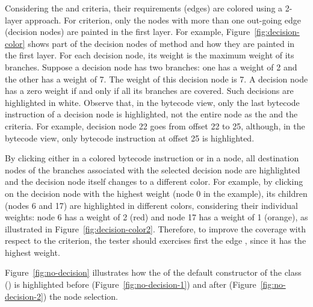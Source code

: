 Considering the  and 
criteria, their requirements (\DUG edges) are colored using a
2-layer approach. For  criterion, only the nodes
with more than one out-going edge (decision nodes) are painted in
the first layer. For example, Figure~\ref{fig:decision-color}
shows part of the decision nodes of method
 and how they are painted in the first
layer. For each decision node, its weight is the maximum weight of
its branches. Suppose a decision node has two branches: one has a
weight of 2 and the other has a weight of 7. The weight of this
decision node is 7. 
A decision node has a zero weight if and only if all its
branches are covered. Such decisions are highlighted in white.
Observe that, in the bytecode view, only the last bytecode
instruction of a decision node is highlighted, not the entire node
as the  and the  criteria. For
example, \DUG decision node 22 goes from offset 22 to 25,
although, in the bytecode view, only bytecode instruction at
offset 25 is highlighted.



By clicking either in a colored bytecode instruction or in a \DUG
node, all destination nodes of the branches associated with the
selected decision node are highlighted and the decision node
itself changes to a different color. For example, by clicking on
the decision node with the highest weight (node 0 in the
example), its children (nodes 6 and 17) are highlighted in
different colors, considering their individual weights: node 6
has a weight of 2 (red) and node 17 has a weight of 1 (orange),
as illustrated in Figure~\ref{fig:decision-color2}. Therefore, to
improve the coverage with respect to the 
criterion, the tester should exercises first the edge
, since it has the highest weight.



Figure~\ref{fig:no-decision} illustrates how the \DUG of the
default constructor of the class 
() is highlighted before
(Figure~\ref{fig:no-decision-1}) and after
(Figure~\ref{fig:no-decision-2}) the node selection.

